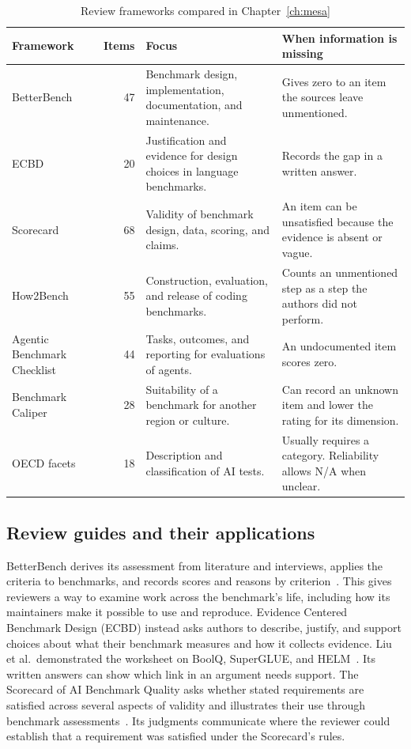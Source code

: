 \begin{table}[tbp]
\centering
\small
\caption{Review frameworks compared in Chapter~\ref{ch:mesa}}
\label{tab:bg_frameworks}
\begin{tabularx}{\textwidth}{@{}>{\raggedright\arraybackslash}p{}r>{\raggedright\arraybackslash}X>{\raggedright\arraybackslash}X@{}}
\toprule
Framework & Items & Focus & When information is missing \\
\midrule
BetterBench~\cite{reuel_betterbench} & 47 & Benchmark design, implementation, documentation, and maintenance. & Gives zero to an item the sources leave unmentioned. \\
ECBD~\cite{liu_ecbd_2024} & 20 & Justification and evidence for design choices in language benchmarks. & Records the gap in a written answer. \\
Scorecard~\cite{san_joaquin_scorecard_2026} & 68 & Validity of benchmark design, data, scoring, and claims. & An item can be unsatisfied because the evidence is absent or vague. \\
How2Bench~\cite{cao_how2bench_2025} & 55 & Construction, evaluation, and release of coding benchmarks. & Counts an unmentioned step as a step the authors did not perform. \\
Agentic Benchmark Checklist~\cite{zhu_agentic_benchmark_checklist_2025} & 44 & Tasks, outcomes, and reporting for evaluations of agents. & An undocumented item scores zero. \\
Benchmark Caliper~\cite{corona_benchmark_caliper_2026} & 28 & Suitability of a benchmark for another region or culture. & Can record an unknown item and lower the rating for its dimension. \\
OECD facets~\cite{cohn_hernandez_orallo_oecd_2023} & 18 & Description and classification of AI tests. & Usually requires a category. Reliability allows N/A when unclear. \\
\bottomrule
\end{tabularx}
\end{table}

\subsection{Review guides and their applications}

BetterBench derives its assessment from literature and interviews, applies the criteria to benchmarks, and records scores and reasons by criterion~\cite{reuel_betterbench}. This gives reviewers a way to examine work across the benchmark's life, including how its maintainers make it possible to use and reproduce. Evidence Centered Benchmark Design (ECBD) instead asks authors to describe, justify, and support choices about what their benchmark measures and how it collects evidence. Liu et al.\ demonstrated the worksheet on BoolQ, SuperGLUE, and HELM~\cite{liu_ecbd_2024}. Its written answers can show which link in an argument needs support. The Scorecard of AI Benchmark Quality asks whether stated requirements are satisfied across several aspects of validity and illustrates their use through benchmark assessments~\cite{san_joaquin_scorecard_2026}. Its judgments communicate where the reviewer could establish that a requirement was satisfied under the Scorecard's rules.

